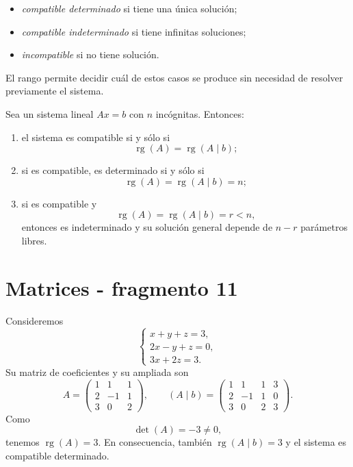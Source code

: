 \begin{itemize}
\item \emph{compatible determinado} si tiene una única solución;
\item \emph{compatible indeterminado} si tiene infinitas soluciones;
\item \emph{incompatible} si no tiene solución.
\end{itemize}

El rango permite decidir cuál de estos casos se produce sin necesidad de resolver previamente el sistema.

\begin{theorem}
Sea un sistema lineal $Ax=b$ con $n$ incógnitas. Entonces:
\begin{enumerate}[label=\roman*)]
\item el sistema es compatible si y sólo si
\[
\operatorname{rg}(A)=\operatorname{rg}(A\mid b);
\]
\item si es compatible, es determinado si y sólo si
\[
\operatorname{rg}(A)=\operatorname{rg}(A\mid b)=n;
\]
\item si es compatible y
\[
\operatorname{rg}(A)=\operatorname{rg}(A\mid b)=r<n,
\]
entonces es indeterminado y su solución general depende de $n-r$ parámetros libres.
\end{enumerate}
\end{theorem}


\section{Matrices - fragmento 11}
\begin{example}
Consideremos
\[
\begin{cases}
x+y+z=3,\\
2x-y+z=0,\\
3x+2z=3.
\end{cases}
\]
Su matriz de coeficientes y su ampliada son
\[
A=\begin{pmatrix}
1&1&1\\
2&-1&1\\
3&0&2
\end{pmatrix},
\qquad
(A\mid b)=
\left(
\begin{array}{ccc|c}
1&1&1&3\\
2&-1&1&0\\
3&0&2&3
\end{array}
\right).
\]
Como
\[
\det(A)=-3\neq0,
\]
tenemos $\operatorname{rg}(A)=3$. En consecuencia, también $\operatorname{rg}(A\mid b)=3$ y el sistema es compatible determinado.
\end{example}

